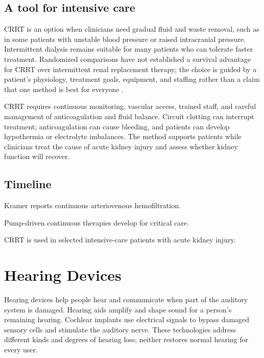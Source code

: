 \documentclass[12pt,oneside]{book}
\begin{document}
\section{A tool for intensive care}
CRRT is an option when clinicians need gradual fluid and waste removal, such
as in some patients with unstable blood pressure or raised intracranial
pressure. Intermittent dialysis remains suitable for many patients who can
tolerate faster treatment. Randomized comparisons have not established a
survival advantage for CRRT over intermittent renal replacement therapy; the
choice is guided by a patient's physiology, treatment goals, equipment, and
staffing rather than a claim that one method is best for everyone
\cite{kdigoAKIControversies,crrtReview}.

CRRT requires continuous monitoring, vascular access, trained staff, and
careful management of anticoagulation and fluid balance. Circuit clotting can
interrupt treatment; anticoagulation can cause bleeding, and patients can
develop hypothermia or electrolyte imbalances. The method supports patients
while clinicians treat the cause of acute kidney injury and assess whether
kidney function will recover.

\section*{Timeline}
\begin{description}[leftmargin=2.3cm,style=nextline]
  \item[1977] Kramer reports continuous arteriovenous hemofiltration.
  \item[1980s--1990s] Pump-driven continuous therapies develop for critical care.
  \item[Today] CRRT is used in selected intensive-care patients with acute kidney injury.
\end{description}
\chapter[Hearing Devices]{Hearing Devices}

Hearing devices help people hear and communicate when part of the auditory
system is damaged. Hearing aids amplify and shape sound for a person's
remaining hearing. Cochlear implants use electrical signals to bypass damaged
sensory cells and stimulate the auditory nerve. These technologies address
different kinds and degrees of hearing loss; neither restores normal hearing
for every user.
\end{document}
